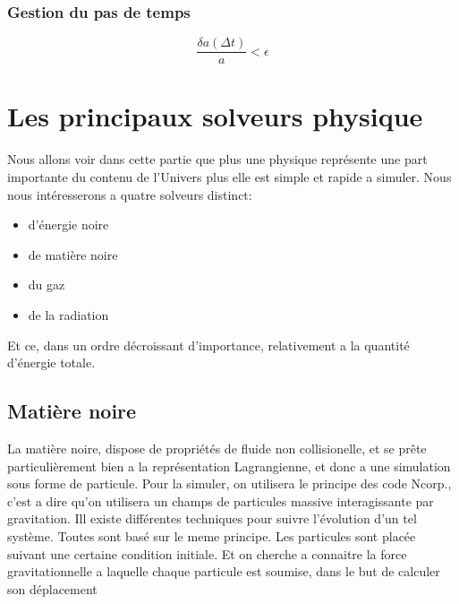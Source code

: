 \subsection{Gestion du pas de temps}


\begin{equation}
\frac{\delta a (\Delta t) } {a} < \epsilon
\end{equation}


\chapter{Les principaux solveurs physique}

Nous allons voir dans cette partie que plus une physique représente une part importante du contenu de l'Univers plus elle est simple et rapide a simuler.
Nous nous intéresserons a quatre solveurs distinct:
\begin{itemize}
\item d'énergie noire
\item de matière noire
\item du gaz
\item de la radiation
\end{itemize}
Et ce, dans un ordre décroissant d'importance, relativement a la quantité d'énergie totale.





\section{Matière noire}

La matière noire, dispose de propriétés de fluide non collisionelle, et se prête particulièrement bien a la représentation Lagrangienne, et donc a une simulation sous forme de particule.
Pour la simuler, on utilisera le principe des code Ncorp., c'est a dire qu'on utilisera un champs de particules massive interagissante par gravitation.
Ill existe différentes techniques pour suivre l'évolution d'un tel système.
Toutes sont basé sur le meme principe.
Les particules sont placée suivant une certaine condition initiale.
Et on cherche a connaitre la force gravitationnelle a laquelle chaque particule est soumise, dans le but de calculer son déplacement


